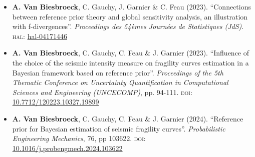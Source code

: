 \begin{itemize}
    \item \textbf{A. Van Biesbroeck}, C. Gauchy, J. Garnier \& C. Feau (2023). ``Connections between reference prior theory and global sensitivity analysis, an illustration with f-divergences''. \emph{Proceedings des 54èmes Journées de Statistiques (JdS)}. \textsc{hal:} \href{https://hal.science/hal-04171446}{hal-04171446}
    \item \textbf{A. Van Biesbroeck}, C. Gauchy, C. Feau \& J. Garnier (2023). ``Influence of the choice of the seismic intensity measure on fragility curves estimation in a Bayesian framework based on reference prior''. \emph{Proceedings of the 5th Thematic Conference on Uncertainty Quantification in Computational Sciences and Engineering (UNCECOMP)}, pp. 94-111. \textsc{doi:} \href{https://dx.doi.org/10.7712/120223.10327.19899}{10.7712/120223.10327.19899}
    \item \textbf{A. Van Biesbroeck}, C. Gauchy, C. Feau \& J. Garnier (2024). ``Reference prior for Bayesian estimation of seismic fragility curves''. \emph{Probabilistic Engineering Mechanics}, 76, pp 103622. \textsc{doi:} \href{https://dx.doi.org/10.1016/j.probengmech.2024.103622}{10.1016/j.probengmech.2024.103622}
\end{itemize}


































\newpage
\renewcommand{\chaptername}{Chapter}
\renewcommand{\partname}{Part}